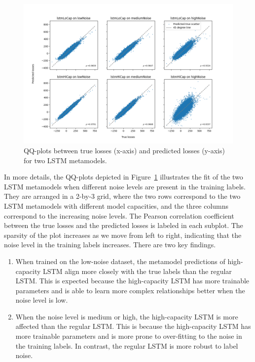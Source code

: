 \begin{figure}[ht!]
    \centering
    \includegraphics[width=\textwidth]{./project2/figures/qqPlots/lstmAll.png}
    \caption{QQ-plots between true losses (x-axis) and predicted losses (y-axis) for two LSTM metamodels.} 
    \label{fig2:QQ_All}
\end{figure}

In more details, the QQ-plots depicted in Figure~\ref{fig2:QQ_All} illustrates the fit of the two LSTM metamodels when different noise levels are present in the training labels.
They are arranged in a 2-by-3 grid, where the two rows correspond to the two LSTM metamodels with different model capacities, and the three columns correspond to the increasing noise levels.
The Pearson correlation coefficient between the true losses and the predicted losses is labeled in each subplot.
The sparsity of the plot increases as we move from left to right, indicating that the noise level in the training labels increases.
There are two key findings.
\begin{enumerate}
    \item   When trained on the low-noise dataset, the metamodel predictions of high-capacity LSTM align more closely with the true labels than the regular LSTM.
    This is expected because the high-capacity LSTM has more trainable parameters and is able to learn more complex relationships better when the noise level is low.
    \item   When the noise level is medium or high, the high-capacity LSTM is more affected than the regular LSTM.
    This is because the high-capacity LSTM has more trainable parameters and is more prone to over-fitting to the noise in the training labels.
    In contrast, the regular LSTM is more robust to label noise.
\end{enumerate}

